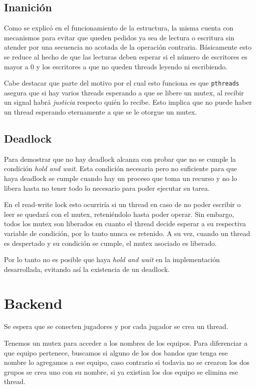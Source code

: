 \documentclass[a4paper]{article}
\begin{document}
\subsection{Inanición}

Como se explicó en el funcionamiento de la estructura, la misma cuenta con
mecanismos para evitar que queden pedidos ya sea de lectura o escritura sin
atender por una secuencia no acotada de la operación contraria. Básicamente esto
se reduce al hecho de que las lecturas deben esperar si el número de escritores
es mayor a 0 y los escritores a que no queden threads leyendo ni escribiendo.

Cabe destacar que parte del motivo por el cual esto funciona es que
\texttt{pthreads} asegura que si hay varios threads esperando a que se libere un
mutex, al recibir un signal habrá \emph{justicia} respecto quién lo recibe. Esto implica
que no puede haber un thread esperando eternamente a que se le otorgue un mutex.

\subsection{Deadlock}

Para demostrar que no hay deadlock alcanza con probar que no se cumple la
condición \emph{hold and wait}. Esta condición necesaria pero no suficiente para
que haya deadlock se cumple cuando hay un proceso que toma un recurso y no lo
libera hasta no tener todo lo necesario para poder ejecutar su tarea.

En el read-write lock esto ocurriría si un thread en caso de no poder escribir o
leer se quedará con el mutex, reteniéndolo hasta poder operar. Sin embargo,
todos los mutex son liberados en cuanto el thread decide esperar a su respectiva
variable de condición, por lo tanto nunca es retenido. A su vez, cuando un
thread es despertado y su condición se cumple, el mutex asociado es liberado.

Por lo tanto no es posible que haya \emph{hold and wait} en la implementación
desarrollada, evitando así la existencia de un deadlock.

\section{Backend}
Se espera que se conecten jugadores y por cada jugador se crea un thread.

Tenemos un mutex para acceder a los nombres de los equipos. Para diferenciar a
que equipo pertenece,  buscamos si alguno de los dos bandos que tenga ese nombre
lo agregamos a ese equipo, caso contrario si todavia no se crearon los dos
grupos se crea uno con su nombre, si ya existian los dos equipo se elimina ese
thread.
\end{document}
